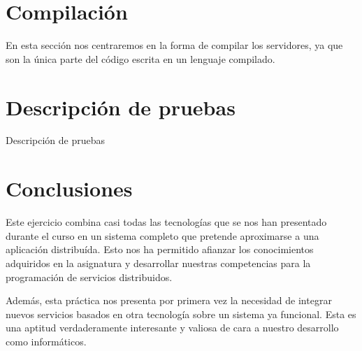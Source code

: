 \documentclass[]{article}
\begin{document}
\section{Compilación}
\label{sec:compilacion}
En esta sección nos centraremos en la forma de compilar los servidores, ya que son la única parte del código escrita en un lenguaje compilado. 

\section{Descripción de pruebas}
\label{sec:descripcion_de_pruebas}
Descripción de pruebas 

\section{Conclusiones}
\label{sec:conclusiones}
Este ejercicio combina casi todas las tecnologías que se nos han presentado durante el curso en un sistema completo que pretende aproximarse a una aplicación distribuída. Esto nos ha permitido afianzar los conocimientos adquiridos en la asignatura y desarrollar nuestras competencias para la programación de servicios distribuidos. 

Además, esta práctica nos presenta por primera vez la necesidad de integrar nuevos servicios basados en otra tecnología sobre un sistema ya funcional. Esta es una aptitud verdaderamente interesante y valiosa de cara a nuestro desarrollo como informáticos.
\end{document}
